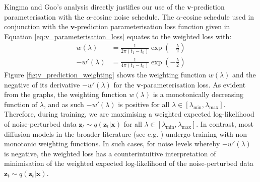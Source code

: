 \documentclass[ oneside,%
                    author={George Herbert},
                    degree={MSci},
                     title={Diffusion Models for Time-Evolving Precipitation Fields},
                  subtitle={}]{dissertation}
\begin{document}
Kingma and Gao's \cite{Understanding_Diffusion_Objective_Kingma} analysis directly justifies our use of the $\mathbf{v}$-prediction parameterisation with the $\alpha$-cosine noise schedule. The $\alpha$-cosine schedule used in conjunction with the $\mathbf{v}$-prediction parameterisation loss function given in Equation \ref{eq:v_parameterisation_loss} equates to the weighted loss with:
\begin{align}
      w(\lambda)&=\frac{1}{2\pi(t_1-t_0)}\exp\left(-\frac{\lambda}{2}\right)\\
      -w'(\lambda)&=\frac{1}{4\pi(t_1-t_0)}\exp\left(-\frac{\lambda}{2}\right)
\end{align}
Figure \ref{fig:v_prediction_weighting} shows the weighting function $w(\lambda)$ and the negative of its derivative $-w'(\lambda)$ for the $\mathbf{v}$-parameterisation loss. As evident from the graphs, the weighting function $w(\lambda)$ is a monotonically decreasing function of $\lambda$, and as such $-w'(\lambda)$ is positive for all $\lambda\in [\lambda_{\min}, \lambda_{\max}]$. Therefore, during training, we are maximising a weighted expected log-likelihood of noise-perturbed data $\mathbf{z}_t\sim q(\mathbf{z}_t|\mathbf{x})$ for all $\lambda\in[\lambda_{\min}, \lambda_{\max}]$. In contrast, most diffusion models in the broader literature (see e.g. \cite{DDPM_Ho,IDDPM_Nichol,Imagen_Saharia}) undergo training with non-monotonic weighting functions. In such cases, for noise levels whereby $-w'(\lambda)$ is negative, the weighted loss has a counterintuitive interpretation of minimisation of the weighted expected log-likelihood of the noise-perturbed data $\mathbf{z}_t\sim q(\mathbf{z}_t|\mathbf{x})$.
\end{document}
